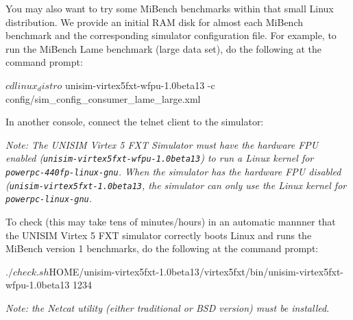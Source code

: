 You may also want to try some MiBench benchmarks within that small Linux distribution.
We provide an initial RAM disk for almost each MiBench benchmark and the corresponding simulator configuration file.
\noindent For example, to run the MiBench Lame benchmark (large data set), do the following at the command prompt:

\begin{script}
   $ cd linux_distro
   $ unisim-virtex5fxt-wfpu-1.0beta13 -c config/sim_config_consumer_lame_large.xml
\end{script}

\noindent In another console, connect the telnet client to the simulator:

\textit{Note: The UNISIM Virtex 5 FXT Simulator must have the hardware FPU enabled (\texttt{unisim\--virtex5fxt\--wfpu\--1.0beta13}) to run a Linux kernel for \texttt{powerpc\--440fp\--linux\--gnu}.
When the simulator has the hardware FPU disabled (\texttt{unisim\--virtex5fxt\--1.0beta13}, the simulator can only use the Linux kernel for \texttt{powerpc\--linux\--gnu}.}

To check (this may take tens of minutes/hours) in an automatic mannner that the UNISIM Virtex 5 FXT simulator correctly boots Linux and runs the MiBench version 1 benchmarks, do the following at the command prompt:
\begin{script}
   $ ./check.sh ${HOME}/unisim-virtex5fxt-1.0beta13/virtex5fxt/bin/unisim-virtex5fxt-wfpu-1.0beta13 1234
\end{script}
\textit{Note: the Netcat utility (either traditional or BSD version) must be installed}.

